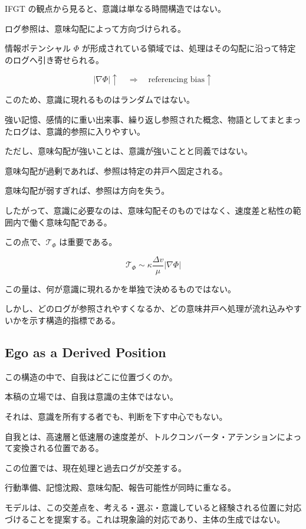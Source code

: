 IFGT の観点から見ると、意識は単なる時間構造ではない。

ログ参照は、意味勾配によって方向づけられる。

情報ポテンシャル $\Phi$ が形成されている領域では、処理はその勾配に沿って特定のログへ引き寄せられる。

\begin{equation}
|\nabla \Phi| \uparrow
\quad \Rightarrow \quad
\text{referencing bias} \uparrow
\end{equation}

このため、意識に現れるものはランダムではない。

強い記憶、感情的に重い出来事、繰り返し参照された概念、物語としてまとまったログは、意識的参照に入りやすい。

ただし、意味勾配が強いことは、意識が強いことと同義ではない。

意味勾配が過剰であれば、参照は特定の井戸へ固定される。

意味勾配が弱すぎれば、参照は方向を失う。

したがって、意識に必要なのは、意味勾配そのものではなく、速度差と粘性の範囲内で働く意味勾配である。

この点で、$\mathcal{T}_{\Phi}$ は重要である。

\begin{equation}
\mathcal{T}_{\Phi}
\sim
\kappa
\frac{\Delta v}{\mu}
|\nabla \Phi|
\end{equation}

この量は、何が意識に現れるかを単独で決めるものではない。

しかし、どのログが参照されやすくなるか、どの意味井戸へ処理が流れ込みやすいかを示す構造的指標である。

\subsection{Ego as a Derived Position}

この構造の中で、自我はどこに位置づくのか。

本稿の立場では、自我は意識の主体ではない。

それは、意識を所有する者でも、判断を下す中心でもない。

自我とは、高速層と低速層の速度差が、トルクコンバータ・アテンションによって変換される位置である。

この位置では、現在処理と過去ログが交差する。

行動準備、記憶沈殿、意味勾配、報告可能性が同時に重なる。

モデルは、この交差点を、考える・選ぶ・意識していると経験される位置に対応づけることを提案する。これは現象論的対応であり、主体の生成ではない。

